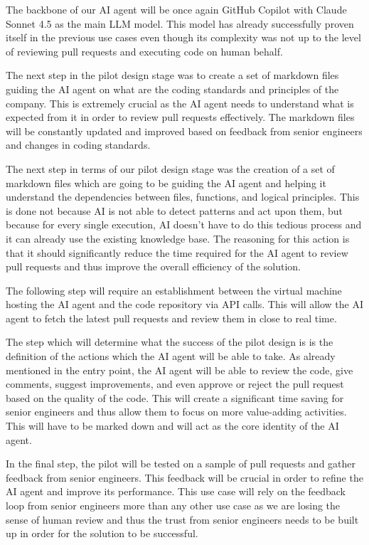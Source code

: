 \documentclass[]{imc-inf}
\begin{document}
The backbone of our AI agent will be once again GitHub Copilot with Claude Sonnet 4.5 as the main LLM model. This model has already successfully proven itself in the previous use cases even though its complexity was not up to the level of reviewing pull requests and executing code on human behalf.

The next step in the pilot design stage was to create a set of markdown files guiding the AI agent on what are the coding standards and principles of the company. This is extremely crucial as the AI agent needs to understand what is expected from it in order to review pull requests effectively. The markdown files will be constantly updated and improved based on feedback from senior engineers and changes in coding standards.

The next step in terms of our pilot design stage was the creation of a set of markdown files which are going to be guiding the AI agent and helping it understand the dependencies between files, functions, and logical principles. This is done not because AI is not able to detect patterns and act upon them, but because for every single execution, AI doesn't have to do this tedious process and it can already use the existing knowledge base. The reasoning for this action is that it should significantly reduce the time required for the AI agent to review pull requests and thus improve the overall efficiency of the solution. 

The following step will require an establishment between the virtual machine hosting the AI agent and the code repository via API calls. This will allow the AI agent to fetch the latest pull requests and review them in close to real time.

The step which will determine what the success of the pilot design is is the definition of the actions which the AI agent will be able to take. As already mentioned in the entry point, the AI agent will be able to review the code, give comments, suggest improvements, and even approve or reject the pull request based on the quality of the code. This will create a significant time saving for senior engineers and thus allow them to focus on more value-adding activities. This will have to be marked down and will act as the core identity of the AI agent. 

In the final step, the pilot will be tested on a sample of pull requests and gather feedback from senior engineers. This feedback will be crucial in order to refine the AI agent and improve its performance. This use case will rely on the feedback loop from senior engineers more than any other use case as we are losing the sense of human review and thus the trust from senior engineers needs to be built up in order for the solution to be successful.  
\end{document}
